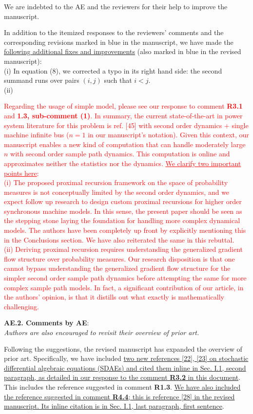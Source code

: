 \documentclass[12pt,onecolumn]{IEEEtran}
\newcommand{\blue}{\color{blue}}
\newcommand{\red}{\textcolor{red}}
\newcommand{\nib}{\noindent  {\bf Response:} }
\begin{document}
{\nib {\blue We are indebted to the AE and the reviewers for their help to improve the manuscript.

In addition to the itemized responses to the reviewers' comments and the corresponding revisions marked in blue in the manuscript, we have made the \ul{following additional fixes and improvements} (also marked in blue in the revised manuscript):\\
(i) In equation (8), we corrected a typo in its right hand side: the second summand runs over pairs $(i,j)$ such that $i<j$.\\
(ii) 

{\red{Regarding the usage of simple model, please see our response to comment \textbf{R3.1} and \textbf{1.3, sub-comment (1)}. In summary, the current state-of-the-art in power system literature for this problem is ref. [45] with second order dynamics + single machine infinite bus ($n=1$ in our manuscript's notation). Given this context, our manuscript enables a new kind of computation that can handle moderately large $n$ with second order sample path dynamics. This computation is online and approximates neither the statistics nor the dynamics.  \ul{We clarify two important points here}:\\(i) The proposed proximal recursion framework on the space of probability measures is not conceptually limited by the second order dynamics, and we expect follow up research to design custom proximal recursions for higher order synchronous machine models. In this sense, the present paper should be seen as the stepping stone laying the foundation for handling more complex dynamical models. The authors have been completely up front by explicitly mentioning this in the Conclusions section. We have also reiterated the same in this rebuttal.\\(ii) Deriving proximal recursion requires understanding the generalized gradient flow structure over probability measures. Our research disposition is that one cannot bypass understanding the generalized gradient flow structure for the simpler second order sample path dynamics before attempting the same for more complex sample path models. In fact, a significant contribution of our article, in the authors' opinion, is that it distills out what exactly is mathematically challenging.}} 
}}


\noindent
{\bf AE.2. Comments by AE}:\\
{\em Authors are also encouraged to revisit their overview of prior art.}

{\nib {\blue Following the suggestions, the revised manuscript has expanded the overview of prior art. Specifically, we have included \ul{two new references [22], [23] on stochastic differential algebraic equations (SDAEs) and cited them inline in Sec. I.1, second paragraph, as detailed in our response to the comment \textbf{R3.2} in this document}. This includes the reference suggested in comment \textbf{R1.3}. \ul{We have also included the reference suggested in comment \textbf{R4.4}; this is reference [28] in the revised manuscript. Its inline citation is in Sec. I.1, last paragraph, first sentence}.}}
\end{document}
